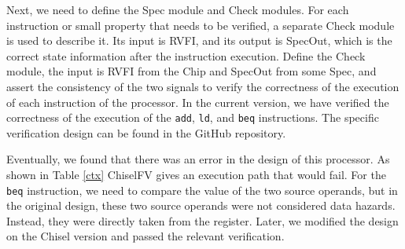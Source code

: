 \documentclass[conference]{IEEEtran}
\theoremstyle{definition}
\begin{document}
Next, we need to define the Spec module and Check modules.
For each instruction or small property that needs to be verified, a separate Check module is used to describe it.
Its input is RVFI, and its output is SpecOut, which is the correct state information after the instruction execution. Define the Check module, the input is RVFI from the Chip and SpecOut from some Spec, and assert the consistency of the two signals to verify the correctness of the execution of each instruction of the processor.
In the current version, we have verified the correctness of the execution of the \verb|add|, \verb|ld|, and \verb|beq| instructions.
The specific verification design can be found in the GitHub repository.

Eventually, we found that there was an error in the design of this processor. 
As shown in Table \ref{ctx}
ChiselFV gives an execution path that would fail. For the \verb|beq| instruction, we need to compare the value of the two source operands, but in the original design, these two source operands were not considered data hazards. 
Instead, they were directly taken from the register. Later, we modified the design on the Chisel version and passed the relevant verification.
\end{document}
